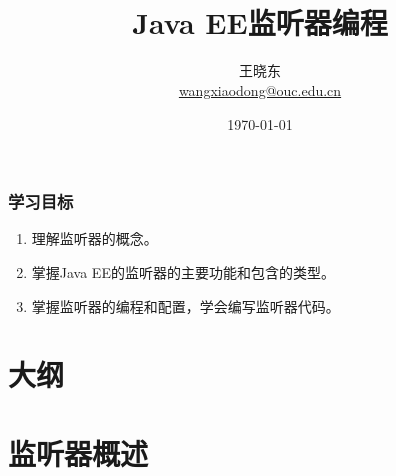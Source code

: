 
\title[KevinW@OUC]{\\  
Java EE监听器编程}
\author[王晓东]{王晓东\\
  \href{mailto:wangxiaodong@ouc.edu.cn}{\footnotesize wangxiaodong@ouc.edu.cn}}
\date{\today}


\frame{\titlepage}

\begin{frame}
  \frametitle{学习目标}
  \begin{enumerate}
  \item 理解监听器的概念。
  \item 掌握Java EE的监听器的主要功能和包含的类型。
  \item 掌握监听器的编程和配置，学会编写监听器代码。
  \end{enumerate}  
\end{frame}

\section*{大纲}

\section{监听器概述}

